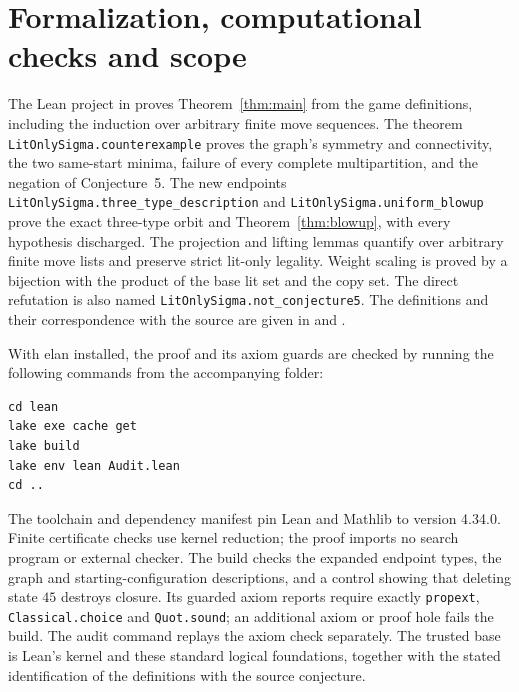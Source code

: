 \documentclass[11pt]{article}
\begin{document}
\section{Formalization, computational checks and scope}\label{sec:checks}
The Lean project in  proves Theorem~\ref{thm:main} from the
game definitions, including the induction over arbitrary finite move
sequences. The theorem \texttt{LitOnlySigma.counterexample} proves the
graph's symmetry and connectivity, the two same-start minima, failure
of every complete multipartition, and the negation of Conjecture~5.
The new endpoints \texttt{LitOnlySigma.three\_type\_description} and
\texttt{LitOnlySigma.uniform\_blowup} prove the exact three-type orbit
and Theorem~\ref{thm:blowup}, with every hypothesis discharged.
The projection and lifting lemmas quantify over arbitrary finite move
lists and preserve strict lit-only legality. Weight scaling is proved by
a bijection with the product of the base lit set and the copy set.
The direct refutation is also named \texttt{LitOnlySigma.not\_conjecture5}.
The definitions and their correspondence with the source are given in
 and .

With elan installed, the proof and its axiom guards are checked by
running the following commands from the accompanying folder:
\begin{verbatim}
cd lean
lake exe cache get
lake build
lake env lean Audit.lean
cd ..
\end{verbatim}
The toolchain and dependency manifest pin Lean and Mathlib to version
4.34.0. Finite certificate checks use kernel reduction; the proof imports
no search program or external checker. The build checks the expanded
endpoint types, the graph and starting-configuration descriptions, and
a control showing that deleting state $45$ destroys closure. Its guarded
axiom reports require exactly \texttt{propext}, \texttt{Classical.choice}
and \texttt{Quot.sound}; an additional axiom or proof hole fails the build.
The audit command replays the axiom check separately. The trusted base is
Lean's kernel and these standard logical foundations, together with the
stated identification of the definitions with the source conjecture.
\end{document}
